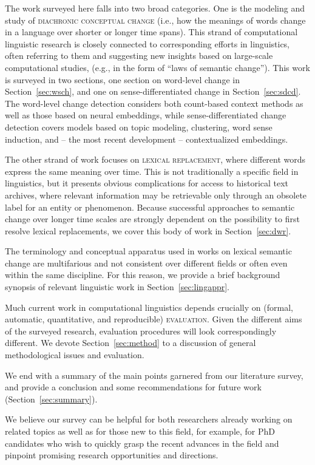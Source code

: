 \documentclass[output=paper]{langsci/langscibook}
\begin{document}
The work surveyed here falls into two broad categories. One is the modeling and study of \textsc{diachronic conceptual change} (i.e., how the meanings of words change in a language over shorter or longer time spans). This strand of computational linguistic research is closely connected to corresponding efforts in linguistics, often referring to them and suggesting new insights based on large-scale computational studies, (e.g., in the form of ``laws of semantic change''). This work is surveyed in two sections, 
one section on word-level change in Section~\ref{sec:wsch}, and one on sense-differentiated change in Section~\ref{sec:sdcd}. The word-level change detection considers both count-based context methods as well as those based on neural embeddings, while sense-differentiated change detection covers models based on topic modeling, clustering, word sense induction,  and -- the most recent development -- contextualized embeddings.\largerpage

The other strand of work focuses on \textsc{lexical replacement}, where different words express the same meaning over time. This is not traditionally a specific field in linguistics, but it presents obvious complications for access to historical text archives, where relevant information may be retrievable only through an obsolete label for an entity or phenomenon. Because successful approaches to semantic change over longer time scales are strongly dependent on the possibility to first resolve lexical replacements, we cover this body of work in Section~\ref{sec:dwr}. 


The terminology and conceptual apparatus used in works on lexical semantic change are multifarious and not consistent over different fields or often even within the same discipline. For this reason, we provide a brief background synopsis of relevant linguistic work
 in Section~\ref{sec:lingappr}.

Much current work in computational linguistics depends crucially on (formal, automatic, quantitative, and reproducible) \textsc{evaluation}. Given the different aims of the surveyed research, evaluation procedures will look correspondingly different. We devote Section~\ref{sec:method} to a discussion of general methodological issues and evaluation.


We end with a summary of the main points garnered from our literature survey, and provide a conclusion and some recommendations for future work (Section~\ref{sec:summary}).

We believe our survey can be helpful for both researchers already working on related topics as well as for those new to this field, for example, for PhD candidates who wish to quickly grasp the recent advances in the field and pinpoint promising research opportunities and directions. 
\end{document}

